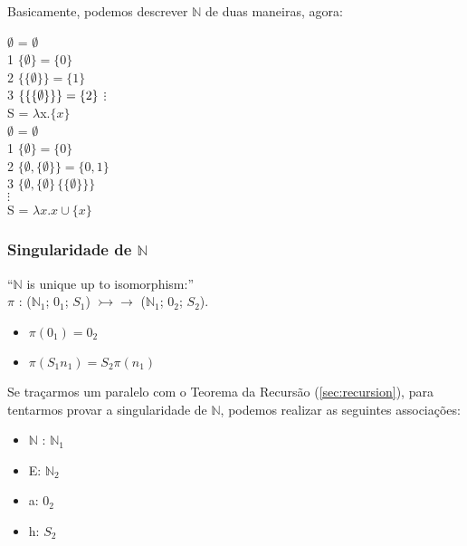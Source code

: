 \documentclass[12pt, a4paper]{article}
\begin{document}
Basicamente, podemos descrever $\mathbb{N}$ de duas maneiras, agora:
\begin{multicols}{2}
 \hspace{4bp} $\emptyset$ = $\emptyset$\\
1 \hspace{4bp} $\{\emptyset\} = \{0\}$\\
2 \hspace{4bp} $\{\{\emptyset\}\} = \{1\}$\\
3 \hspace{4bp} $\{\{\{\emptyset\}\}\} = \{2\}\\$
$\vdots$\\
\hspace{5bp} S = $\lambda$x.$\{x\}$ \\

 \hspace{4bp} $\emptyset$ = $\emptyset$\\
1 \hspace{4bp} $\{\emptyset\} = \{0\}$\\
2 \hspace{4bp} $\{\emptyset, \{\emptyset\}\} = \{0,1\}$\\
3 \hspace{4bp} $\{\emptyset, \{\emptyset\}\, \{\{\emptyset\}\}\}$\\
$\vdots$\\
\hspace{5bp} S = $\lambda x.x \cup \{x\} $
\end{multicols}

\subsubsection{Singularidade de $\mathbb{N}$}
``$\mathbb{N}$ is unique up to isomorphism:''\\
$\pi$ : ($\mathbb{N}_1$; $0_1$; $S_1$) $ \rightarrowtail\!\!\!\!\!\rightarrow $ ($\mathbb{N}_1$; $0_2$; $S_2$).
\begin{itemize}
\item[]\hspace{4bp}$\pi (0_1) = 0_2$
\item[]\hspace{4bp}$\pi (S_1 n_1) = S_2 \pi (n_1)$
\end{itemize}

Se traçarmos um paralelo com o Teorema da Recursão (\ref{sec:recursion}), para tentarmos provar a singularidade de $\mathbb{N}$, podemos realizar as seguintes associações:
\begin{itemize}
\item $\mathbb{N}$ : $\mathbb{N}_1$
\item E: $\mathbb{N}_2$
\item a: $0_2$
\item h: $S_2$
\end{itemize}
\end{document}
